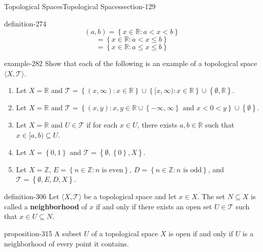 \documentclass[oneside,10pt,]{article}
\newcommand{\terminology}[1]{\textbf{#1}}
\newcommand{\tuple}[1]{\langle #1 \rangle}
\newcommand{\mb}{\mathbb}
\newcommand{\mc}{\mathcal}
\newcommand{\setBuilder}[2]{\left\{#1:#2\right\}}
\newcommand{\setList}[1]{\left\{#1\right\}}
\newcommand{\lt}{<}
\begin{document}
\begin{sectionptx}{Topological Spaces}{}{Topological Spaces}{}{}{section-129}
\begin{definition}{}{definition-274}
\begin{equation*}
(a,b)=\setBuilder{x\in\mb R}{a\lt x\lt b}
\end{equation*}
%
\begin{equation*}
[a,b)=\setBuilder{x\in\mb R}{a\leq x\lt b}
\end{equation*}
%
\begin{equation*}
(a,b]=\setBuilder{x\in\mb R}{a\lt x\leq b}
\end{equation*}
%
\begin{equation*}
[a,b]=\setBuilder{x\in\mb R}{a\leq x\leq b}
\end{equation*}
\end{definition}
\begin{example}{}{example-282}%
\hypertarget{p-283}{}%
Show that each of the following is an example of a topological space \(\tuple{X,\mc T}\).%
\leavevmode%
\begin{enumerate}
\item\hypertarget{li-286}{}Let \(X=\mb R\) and \(\mc T=\setBuilder{(x,\infty)}{x\in\mb R}
\cup\setBuilder{[x,\infty)}{x\in\mb R}\cup\setList{\emptyset,\mb R}\).%
\item\hypertarget{li-289}{}Let \(X=\mb R\) and \(\mc T=\setBuilder{(x,y)}{
x,y\in\mb R\cup\setList{-\infty,\infty} \text{ and }x\lt 0\lt y
}\cup\setList{\emptyset}\).%
\item\hypertarget{li-292}{}Let \(X=\mb R\) and \(U\in\mc T\) if for each \(x\in U\), there exists \(a,b\in\mb R\) such that \(x\in[a,b)\subseteq U\).%
\item\hypertarget{li-298}{}Let \(X=\setList{0,1}\) and \(\mc T=\setList{\emptyset,\setList{0},X}\).%
\item\hypertarget{li-301}{}Let \(X=\mb Z\), \(E=\setBuilder{n\in\mb Z}{n\text{ is even}}\), \(D=\setBuilder{n\in\mb Z}{n\text{ is odd}}\), and \(\mc T=\setList{\emptyset,E,D,X}\).%
\end{enumerate}
\end{example}
\begin{definition}{}{definition-306}%
\hypertarget{p-307}{}%
Let \(\tuple{X,\mc T}\) be a topological space and let \(x\in X\). The set \(N\subseteq X\) is called a \terminology{neighborhood} of \(x\) if and only if there exists an open set \(U\in\mc T\) such that \(x\in U\subseteq N\).%
\end{definition}
\begin{proposition}{}{}{proposition-315}%
\hypertarget{p-316}{}%
A subset \(U\) of a topological space \(X\) is open if and only if \(U\) is a neighborhood of every point it contains.%
\end{proposition}

\end{sectionptx}
\end{document}
